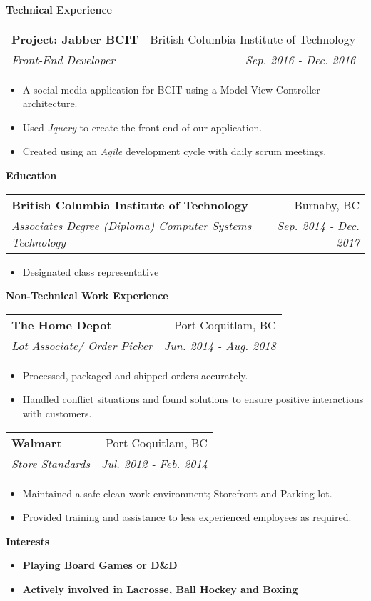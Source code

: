 \documentclass[letterpaper,11pt]{article}
\makeatletter
\newcommand{\resheading}[1]{{\large \colorbox{mygrey}{\begin{minipage}{\textwidth}{\textbf{#1 \vphantom{p\^{E}}}}\end{minipage}}}}
\newcommand{\ressubheading}[4]{
\begin{tabular*}{7.0in}{l@{\extracolsep{\fill}}r}
		\textbf{#1} & #2 \\
		\textit{#3} & \textit{#4} \\
\end{tabular*}\vspace{-6pt}}
\makeatother
\begin{document}
\vspace{0.2in}
\resheading{Technical Experience}
\begin{description}
\item
    \ressubheading{Project: Jabber BCIT}{British Columbia Institute of Technology}{Front-End Developer}{Sep. 2016 - Dec. 2016}
	\begin{itemize}
		\item{A social media application for BCIT using a Model-View-Controller architecture.}
        \item{Used \emph{Jquery} to create the front-end of our application.}
        \item{Created using an \emph{Agile} development cycle with daily scrum meetings.}
	\end{itemize}
\end{description}
\resheading{Education}
\begin{description}
\item
	\ressubheading{British Columbia Institute of Technology}{Burnaby, BC}{Associate\textsc{\char13}s Degree (Diploma) Computer Systems Technology}{Sep. 2014 - Dec. 2017}
    \begin{itemize}
    	\item{Designated class representative}
	\end{itemize}
\end{description}
\vspace{0.2in}
\resheading{Non-Technical Work Experience}
\begin{description}
\item
    \ressubheading{The Home Depot}{Port Coquitlam, BC}{Lot Associate/ Order Picker}{Jun. 2014 - Aug. 2018}
	\begin{itemize}
    	\item{Processed, packaged and shipped orders accurately.}
		\item{Handled conflict situations and found solutions to ensure positive interactions with customers.}
        
	\end{itemize}
\item
	\ressubheading{Walmart}{Port Coquitlam, BC}{Store Standards}{Jul. 2012 - Feb. 2014}
	\begin{itemize}
		\item{Maintained a safe clean work environment; Storefront and Parking lot.}
        \item{Provided training and assistance to less experienced employees as required.}
	\end{itemize}

\end{description}

\vspace{0.1in}
\resheading{Interests}
\begin{itemize}
	\item{\textbf{Playing Board Games or D\&D}}
    \item{\textbf{Actively involved in Lacrosse, Ball Hockey and Boxing}}
\end{itemize}
\end{document}
